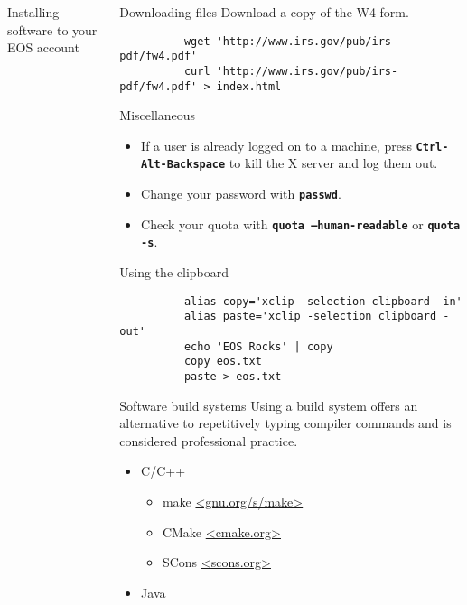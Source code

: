 \documentclass[8pt]{beamer}
\newcommand{\command}[1]{\textbf{\texttt{#1}}}
\begin{document}
\begin{frame}[fragile]{}
\begin{columns}
\begin{column}{0.33\textwidth}
\begin{block}{Installing software to your EOS account}
        {\scriptsize \inputminted[tabsize=2]{bash}{scripts/install-aria2.bash}}
      \end{block}
    \end{column}
    \begin{column}{0.33\textwidth}
      \begin{block}{Downloading files}
        Download a copy of the W4 form.
        \begin{verbatim}
          wget 'http://www.irs.gov/pub/irs-pdf/fw4.pdf'
          curl 'http://www.irs.gov/pub/irs-pdf/fw4.pdf' > index.html
        \end{verbatim}
      \end{block}
      \begin{block}{Miscellaneous}
        \begin{itemize}
        \item If a user is already logged on to a machine, press \command{Ctrl-Alt-Backspace} to kill the X server and log them out.
        \item Change your password with \command{passwd}.
        \item Check your quota with \command{quota --human-readable} or \command{quota -s}.
        \end{itemize}
      \end{block}
      \begin{block}{Using the clipboard}
        \begin{verbatim}
          alias copy='xclip -selection clipboard -in'
          alias paste='xclip -selection clipboard -out'
          echo 'EOS Rocks' | copy
          copy eos.txt
          paste > eos.txt
        \end{verbatim}
      \end{block}
      \begin{block}{Software build systems}
        Using a build system offers an alternative to repetitively typing compiler commands and is considered professional practice.
        \begin{itemize}
        \item C/C++
          \begin{itemize}
          \item make \url{<gnu.org/s/make>}
          \item CMake \url{<cmake.org>}
          \item SCons \url{<scons.org>}
          \end{itemize}
        \item Java

\end{itemize}
\end{block}
\end{column}
\end{columns}
\end{frame}
\end{document}
